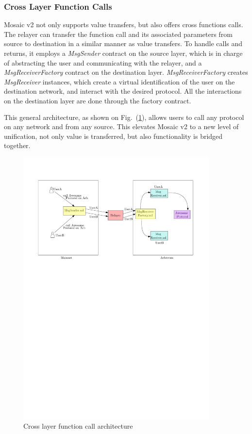 \subsubsection*{Cross Layer Function Calls}
Mosaic v2 not only supports value transfers, but also offers cross functions calls. The relayer can transfer the function call and its associated parameters from source to destination in a similar manner as value transfers. To handle calls and returns, it employs a \textit{MsgSender} contract on the source layer, which is in charge of abstracting the user and communicating with the relayer, and a \textit{MsgReceiverFactory} contract on the destination layer. \textit{MsgReceiverFactory} creates \textit{MsgReceiver} instances, which create a virtual identification of the user on the destination network, and interact with the desired protocol. All the interactions on the destination layer are done through the factory contract.

This general architecture, as shown on Fig.~(\ref{fig:crosscall}), allows users to call any protocol on any network and from any source. This elevates Mosaic v2 to a new level of unification, not only value is transferred, but also functionality is bridged together. 

\begin{figure}[H]
    \centering
    \includegraphics[width=0.9\textwidth]{images/mosaic/crosscalls.pdf}
    \caption{Cross layer function call architecture}
    \label{fig:crosscall}
\end{figure}


